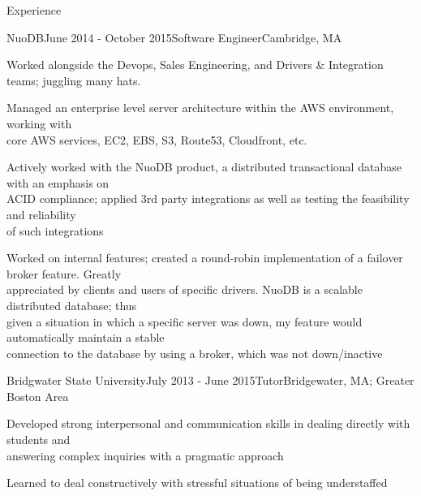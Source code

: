 \documentclass{resume} %
\begin{document}
\begin{rSection}{Experience}
\begin{rSubsection}{NuoDB}{June 2014 - October 2015}{Software Engineer}{Cambridge, MA}
 \item Worked alongside the Devops, Sales Engineering, and Drivers \& Integration teams; juggling many hats. 
 	      \item Managed an enterprise level server architecture within the AWS environment, working with 
	      \\core AWS services, EC2, EBS, S3, Route53, Cloudfront, etc. 
          \item Actively worked with the NuoDB product, a distributed transactional database with an emphasis on\\ ACID compliance; applied 3rd party integrations as well as testing the feasibility and reliability\\ of such integrations
   	\item Worked on internal features; created a round-robin implementation of a failover broker feature. Greatly \\appreciated by clients and users of specific drivers. NuoDB is a scalable distributed database; thus\\ given a situation in which a specific server was down, my feature would automatically maintain a stable\\ connection to the database by using a broker, which was not down/inactive
         
\end{rSubsection}


\begin{rSubsection}{Bridgwater State University}{July 2013 - June 2015}{Tutor}{Bridgewater, MA; Greater Boston Area}
 	      \item Developed strong interpersonal and communication skills in dealing directly with students and \\ answering complex inquiries with a pragmatic approach
          \item Learned to deal constructively with stressful situations of being understaffed
\end{rSubsection}


\end{rSection}
\end{document}
